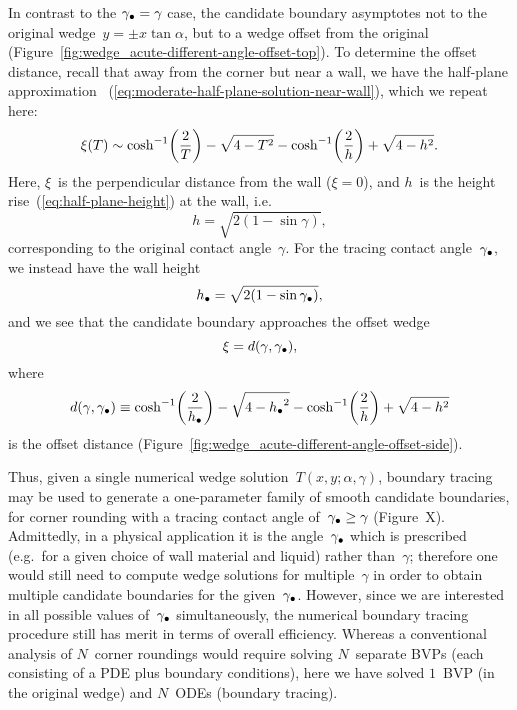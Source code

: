 In contrast to the $\gamma_\bullet = \gamma$ case,
the candidate boundary asymptotes
not to the original wedge~$y = \pm x \tan\alpha$,
but to a wedge offset from the original
(Figure~\ref{fig:wedge_acute-different-angle-offset-top}).
To determine the offset distance,
recall that away from the corner but near a wall,
we have the half-plane approximation~%
  (\ref{eq:moderate-half-plane-solution-near-wall}),
which we repeat here:
\begin{equation}
  \xi (T) \asy
    \cosh^{-1} \roundbr*{\frac{2}{T}} - \sqrt{4 - T^2}
    - \cosh^{-1} \roundbr*{\frac{2}{h}} + \sqrt{4 - h^2}.
    \label{eq:moderate-half-plane-solution-near-wall-repeat}
\end{equation}
Here, $\xi$~is the perpendicular distance from the wall ($\xi = 0$),
and $h$~is the height rise~(\ref{eq:half-plane-height}) at the wall,
i.e.
\begin{equation}
  h = \sqrt{2 (1 - \sin\gamma)},
  \label{eq:half-plane-height-repeat}
\end{equation}
corresponding to the original contact angle~$\gamma$.
For the tracing contact angle~$\gamma_\bullet$,
we instead have the wall height
\begin{equation}
  h_\bullet = \sqrt{2 (1 - \sin\gamma_\bullet)},
  \label{eq:half-plane-height-different-angle}
\end{equation}
and we see that the candidate boundary approaches the offset wedge
\begin{equation}
  \xi = d (\gamma, \gamma_\bullet),
  \label{eq:moderate-offset-wedge}
\end{equation}
where
\begin{equation}
  d (\gamma, \tr{\gamma}) \ideq
    \cosh^{-1} \roundbr*{\frac{2}{\tr{h}}} - \sqrt{4 - {\tr{h}}^2}
    - \cosh^{-1} \roundbr*{\frac{2}{h}} + \sqrt{4 - h^2}
  \label{eq:moderate-offset-distance}
\end{equation}
is the offset distance
(Figure~\ref{fig:wedge_acute-different-angle-offset-side}).

Thus, given a single numerical wedge solution~$T (x, y; \alpha, \gamma)$,
boundary tracing may be used to generate a one-parameter family
of smooth candidate boundaries,
for corner rounding
with a tracing contact angle of~$\gamma_\bullet \ge \gamma$
(Figure~X). %
Admittedly, in a physical application
it is the angle~$\gamma_\bullet$ which is prescribed
(e.g.~for a given choice of wall material and liquid)
rather than~$\gamma$;
therefore one would still need to compute wedge solutions
for multiple~$\gamma$
in order to obtain multiple candidate boundaries
for the given~$\gamma_\bullet$.
However, since we are interested in
all possible values of~$\gamma_\bullet$ simultaneously,
the numerical boundary tracing procedure
still has merit in terms of overall efficiency.
Whereas a conventional analysis of $N$~corner roundings
would require solving $N$~separate BVPs
(each consisting of a PDE plus boundary conditions),
here we have solved $1$~BVP (in the original wedge)
and $N$~ODEs (boundary tracing).

